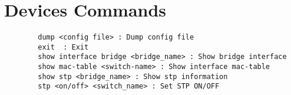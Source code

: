 \chapter{Devices Commands}
\label{ch:commands}
\lstset{language=inform,caption=Switch commands ,label=lst:sw-commands}
\begin{lstlisting}
		dump <config file> : Dump config file
		exit  : Exit
		show interface bridge <bridge_name> : Show bridge interface
		show mac-table <switch-name> : Show interface mac-table
		show stp <bridge_name> : Show stp information
		stp <on/off> <switch_name> : Set STP ON/OFF
\end{lstlisting}
